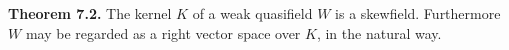 \textbf{Theorem 7.2.} The kernel $K$ of a weak quasifield $W$ is a skewfield. Furthermore $W$ may be regarded as a right vector space over $K$, in the natural way.
